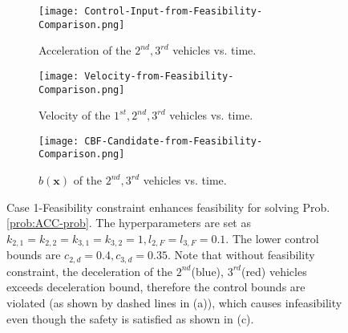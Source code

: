 \documentclass[letterpaper, 10 pt, conference]{ieeeconf}
\theoremstyle{definition}
\begin{document}
\begin{figure*}[t]
    \vspace{3mm}
    \centering
    \begin{subfigure}[t]{0.32\linewidth}
        \centering
        \texttt{[image: Control-Input-from-Feasibility-Comparison.png]}
        \caption{Acceleration of the $2^{nd},3^{rd}$ vehicles vs. time.}
        \label{fig:control input 1}
    \end{subfigure}
    \begin{subfigure}[t]{0.32\linewidth}
        \centering
        \texttt{[image: Velocity-from-Feasibility-Comparison.png]}
        \caption{Velocity of the $1^{st},2^{nd},3^{rd}$ vehicles vs. time.}
        \label{fig:velocity 1}
    \end{subfigure}  
    \begin{subfigure}[t]{0.32\linewidth}
        \centering
        \texttt{[image: CBF-Candidate-from-Feasibility-Comparison.png]}
       \caption{$b(\boldsymbol{x})$ of the $2^{nd},3^{rd}$ vehicles vs. time.}
        \label{fig:distance 1}
    \end{subfigure}
    \caption{Case 1-Feasibility constraint enhances feasibility for solving Prob. \ref{prob:ACC-prob}. The hyperparameters are set as $k_{2,1}=k_{2,2}=k_{3,1}=k_{3,2}=1,l_{2,F}=l_{3,F}=0.1.$ The lower control bounds are $c_{2,d}=0.4,c_{3,d}=0.35.$ Note that without feasibility constraint, the deceleration of the $2^{nd}$(blue), $3^{rd}$(red) vehicles exceeds deceleration bound, therefore the control bounds are violated (as shown by dashed lines in (a)), which causes infeasibility even though the safety is satisfied as shown in (c).} 
    \label{fig:feasibility enhanced}
\end{figure*}
\end{document}
